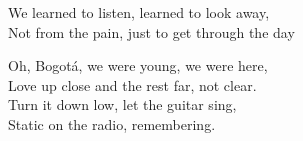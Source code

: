 \begin{lyrics}
We learned to listen, learned to look away,\\
Not from the pain, just to get through the day

Oh, Bogotá, we were young, we were here,\\
Love up close and the rest far, not clear.\\
Turn it down low, let the guitar sing,\\
Static on the radio, remembering.
\end{lyrics}

